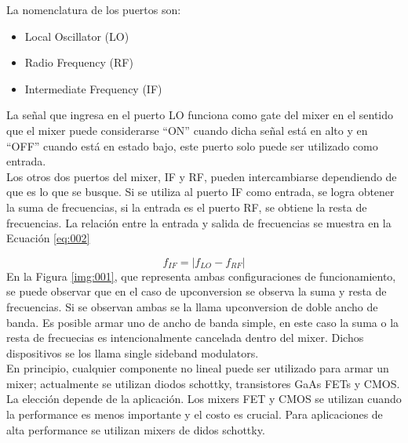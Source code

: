 \documentclass[a4paper,10pt]{article}
\begin{document}
	\indent La nomenclatura de los puertos son:
	\begin{itemize}
		\item Local Oscillator (LO)
		\item Radio Frequency (RF)
		\item Intermediate Frequency (IF)
	\end{itemize}

	\indent La señal que ingresa en el puerto LO funciona como gate del mixer 
	en el sentido que el mixer puede considerarse ``ON'' cuando dicha señal está
	en alto y en ``OFF'' cuando está en estado bajo, este puerto solo puede ser 
	utilizado como entrada. \\
	\indent Los otros dos puertos del mixer, IF y RF, pueden intercambiarse 
	dependiendo de que es lo que se busque. Si se utiliza al puerto IF como 
	entrada, se logra obtener la suma de frecuencias, si la entrada es 
	el puerto RF, se obtiene la resta de frecuencias. La relación entre la 
	entrada y salida de frecuencias se muestra en la Ecuación \ref{eq:002}

	\begin{equation}\label{eq:002}
		f_{IF} = |f_{LO} - f_{RF}|
	\end{equation}
	\indent En la Figura \ref{img:001}, que representa ambas configuraciones de 
	funcionamiento, se puede observar que en el caso de upconversion se observa
	la suma y resta de frecuencias. Si se observan ambas se la llama 
	upconversion de doble ancho de banda. Es posible armar uno de ancho de banda
	simple, en este caso la suma o la resta de frecuecias es intencionalmente 
	cancelada dentro del mixer. Dichos dispositivos se los llama single sideband
	modulators. \\
	\indent En principio, cualquier componente no lineal puede ser utilizado 
	para armar un mixer; actualmente se utilizan diodos schottky, transistores 
	GaAs FETs y CMOS. La elección depende de la aplicación. Los mixers FET y 
	CMOS se utilizan cuando la performance es menos importante y el costo es 
	crucial. Para aplicaciones de alta performance se utilizan mixers de didos 
	schottky.
	
\end{document}
